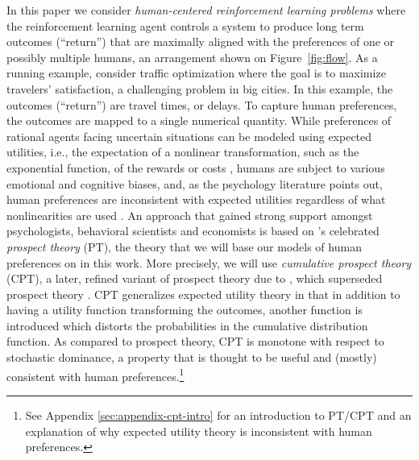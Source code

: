 In this paper we consider \emph{human-centered reinforcement learning problems}
where the  reinforcement learning agent controls a system 
to produce long term outcomes (``return'') that are maximally aligned with the preferences of 
one or possibly multiple humans, an arrangement shown on Figure~\ref{fig:flow}.
As a running example, consider traffic optimization where the goal is to maximize
travelers' satisfaction, a challenging problem 
in big cities.
In this example, the outcomes (``return'') are travel times, or delays. 
To capture human preferences, the outcomes are mapped to a single numerical quantity.
While preferences of rational agents facing uncertain situations can be modeled using expected utilities,
i.e., the expectation of a nonlinear transformation, such as the exponential function, of the rewards or costs
\citep{NeuMo44,fishburn1970expectedutility}, 
	humans are subject to various emotional and cognitive biases,
	and, as the psychology literature points out, human preferences 
	are inconsistent with expected utilities regardless of what nonlinearities are used
	 \citep{allais53,ellsberg61,kahneman1979prospect}.
An approach that gained 
	strong support amongst psychologists, behavioral scientists and economists  \citep[e.g.,][]{starmer2000developments,quiggin2012generalized}
	is based on \cite{kahneman1979prospect}'s celebrated \emph{prospect theory} (PT),
	the theory that we will base our models of human preferences on
	 in this work.
More precisely, we will use \emph{cumulative prospect theory} (CPT),
 	a later, refined variant of prospect theory due to \citet{tversky1992advances}, 
	which superseded prospect theory \citep[e.g.,][]{Barberis:2012vs}.
CPT generalizes expected utility theory in that in addition to having a utility function transforming
	the outcomes, another function is introduced which distorts the probabilities in the cumulative distribution function.
As compared to prospect theory, CPT is monotone with respect to stochastic dominance, a property
	that is thought to be useful and (mostly) consistent with human preferences.\footnote{See Appendix \ref{sec:appendix-cpt-intro} for an introduction to PT/CPT and an explanation of why expected utility theory is inconsistent with human preferences.}
	
